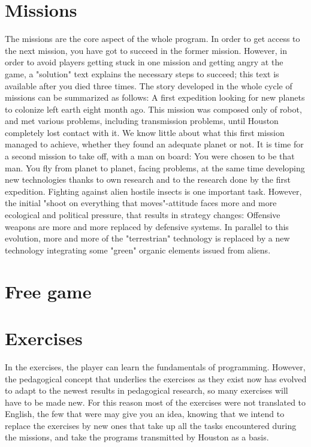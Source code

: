 \chapter{Missions}

The missions are the core aspect of the whole program. In order to get access to the next mission, you have got to succeed in the former mission. However, in order to avoid players getting stuck in one mission and getting angry at the game, a "solution" text explains the necessary steps to succeed; this text is available after you died three times.
The story developed in the whole cycle of missions can be summarized as follows: A first expedition looking for new planets to colonize left earth eight month ago. This mission was composed only of robot, and met various problems, including transmission problems, until Houston completely lost contact with it.
We know little about what this first mission managed to achieve, whether they found an adequate planet or not. It is time for a second mission to take off, with a man on board: You were chosen to be that man.
You fly from planet to planet, facing problems, at the same time developing new technologies thanks to own research and to the research done by the first expedition. Fighting against alien hostile insects is one important task.
However, the initial "shoot on everything that moves"-attitude faces more and more ecological and political pressure, that results in strategy changes: Offensive weapons are more and more replaced by defensive systems. In parallel to this evolution, more and more of the "terrestrian" technology is replaced by a new technology integrating some "green" organic elements issued from aliens.


\chapter{Free game}



\chapter{Exercises}

In the exercises, the player can learn the fundamentals of programming. However, the pedagogical concept that underlies the exercises as they exist now has evolved to adapt to the newest results in pedagogical research, so many exercises will have to be made new. For this reason most of the exercises were not translated to English, the few that were may give you an idea, knowing that we intend to replace the exercises by new ones that take up all the tasks encountered during the missions, and take the programs transmitted by Houston as a basis.


